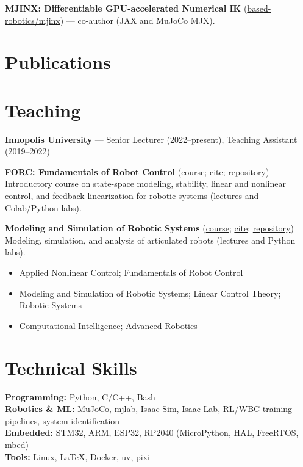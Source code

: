 \documentclass[11pt,a4paper]{article}
\begin{document}
\textbf{MJINX: Differentiable GPU-accelerated Numerical IK} (\href{https://github.com/based-robotics/mjinx}{based-robotics/mjinx}) — co-author (JAX and MuJoCo MJX).

\section{Publications}



\section{Teaching}

\textbf{Innopolis University} — Senior Lecturer (2022--present), Teaching Assistant (2019--2022)

\textbf{FORC: Fundamentals of Robot Control} (\href{https://simeon-ned.github.io/forc/}{course}; \href{https://simeon-ned.github.io/forc/cite/}{cite}; \href{https://github.com/simeon-ned/forc}{repository})\\
Introductory course on state-space modeling, stability, linear and nonlinear control, and feedback linearization for robotic systems (lectures and Colab/Python labs).

\textbf{Modeling and Simulation of Robotic Systems} (\href{https://simeon-ned.github.io/robotic_systems/}{course}; \href{https://simeon-ned.github.io/robotic_systems/cite/}{cite}; \href{https://github.com/simeon-ned/robotic_systems}{repository})\\
Modeling, simulation, and analysis of articulated robots (lectures and Python labs).

\begin{itemize}[leftmargin=*, nosep, topsep=0.2em]
  \item Applied Nonlinear Control; Fundamentals of Robot Control
  \item Modeling and Simulation of Robotic Systems; Linear Control Theory; Robotic Systems
  \item Computational Intelligence; Advanced Robotics
\end{itemize}

\section{Technical Skills}

\textbf{Programming:} Python, C/C++, Bash\\
\textbf{Robotics \& ML:} MuJoCo, mjlab, Isaac Sim, Isaac Lab, RL/WBC training pipelines, system identification\\
\textbf{Embedded:} STM32, ARM, ESP32, RP2040 (MicroPython, HAL, FreeRTOS, mbed)\\
\textbf{Tools:} Linux, LaTeX, Docker, uv, pixi
\end{document}
